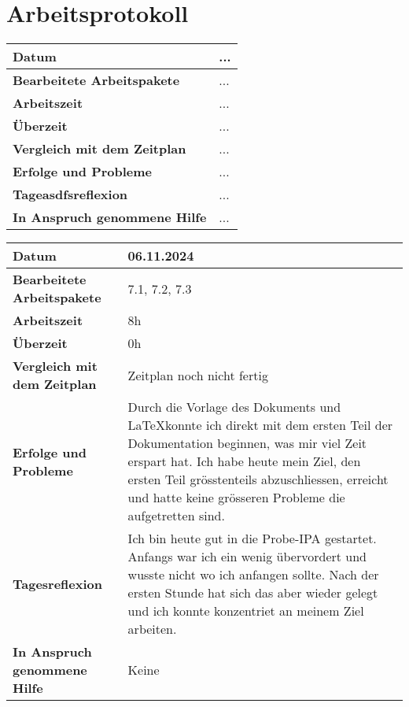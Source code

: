 \chapter{Arbeitsprotokoll}\label{ch:arbeitsprotokoll}
\renewcommand{\arraystretch}{1.5}

\begin{longtable}{p{}|p{}}
    \hline
    \textbf{Datum}                       & ...            \\
    \hline
    \textbf{Bearbeitete Arbeitspakete}   & ...                  \\
    \hline
    \textbf{Arbeitszeit}                 & ...                                    \\
    \hline
    \textbf{Überzeit}                    & ...                                    \\
    \hline
    \textbf{Vergleich mit dem Zeitplan}  & ... \\
    \hline
    \textbf{Erfolge und Probleme} & ...
    \\
    \hline
    \textbf{Tageasdfsreflexion} & ...
    \\
    \hline
    \textbf{In Anspruch genommene Hilfe} & ...                              \\
    \hline
\end{longtable}\label{tab:arbeitsprotokoll-...}

\newpage
\begin{longtable}{p{}|p{}}
	\hline
	\textbf{Datum}                       & 06.11.2024            \\
	\hline
	\textbf{Bearbeitete Arbeitspakete}   & 7.1, 7.2, 7.3                  \\
	\hline
	\textbf{Arbeitszeit}                 & 8h                                    \\
	\hline
	\textbf{Überzeit}                    & 0h                                    \\
	\hline
	\textbf{Vergleich mit dem Zeitplan}  & Zeitplan noch nicht fertig \\
	\hline
	\textbf{Erfolge und Probleme} & Durch die Vorlage des Dokuments und \LaTeX konnte ich direkt mit dem ersten Teil der Dokumentation beginnen, was mir viel Zeit erspart hat. Ich habe heute mein Ziel, den ersten Teil grösstenteils abzuschliessen, erreicht und hatte keine grösseren Probleme die aufgetretten sind.
	\\
	\hline
	\textbf{Tagesreflexion} & Ich bin heute gut in die Probe-IPA gestartet. Anfangs war ich ein wenig übervordert und wusste nicht wo ich anfangen sollte. Nach der ersten Stunde hat sich das aber wieder gelegt und ich konnte konzentriet an meinem Ziel arbeiten.
	\\
	\hline
	\textbf{In Anspruch genommene Hilfe} & Keine                              \\
	\hline
\end{longtable}\label{tab:arbeitsprotokoll-06.11.2024}
\newpage
